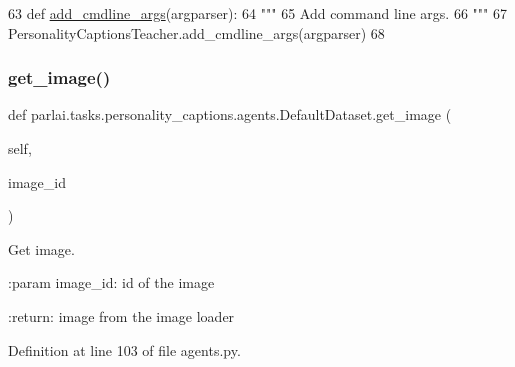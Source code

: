 \begin{DoxyCode}
63     \textcolor{keyword}{def }\hyperlink{namespaceparlai_1_1agents_1_1drqa_1_1config_a62fdd5554f1da6be0cba185271058320}{add\_cmdline\_args}(argparser):
64         \textcolor{stringliteral}{"""}
65 \textcolor{stringliteral}{        Add command line args.}
66 \textcolor{stringliteral}{        """}
67         PersonalityCaptionsTeacher.add\_cmdline\_args(argparser)
68 
\end{DoxyCode}
\mbox{\label{classparlai_1_1tasks_1_1personality__captions_1_1agents_1_1DefaultDataset_a1af0abcddf51525898da67e2e796c525}} 
\subsubsection{\texorpdfstring{get\+\_\+image()}{get\_image()}}
{\footnotesize\ttfamily def parlai.\+tasks.\+personality\+\_\+captions.\+agents.\+Default\+Dataset.\+get\+\_\+image (\begin{DoxyParamCaption}\item[{}]{self,  }\item[{}]{image\+\_\+id }\end{DoxyParamCaption})}

\begin{DoxyVerb}Get image.

:param image_id:
    id of the image

:return:
    image from the image loader
\end{DoxyVerb}
 

Definition at line 103 of file agents.\+py.


